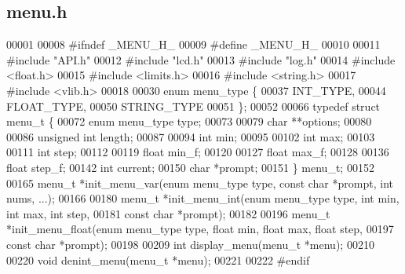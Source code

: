 \subsection{menu.\+h}
\label{menu_8h_source}

\begin{DoxyCode}
00001 
00008 \textcolor{preprocessor}{#ifndef \_MENU\_H\_}
00009 \textcolor{preprocessor}{#define \_MENU\_H\_}
00010 
00011 \textcolor{preprocessor}{#include "API.h"}
00012 \textcolor{preprocessor}{#include "lcd.h"}
00013 \textcolor{preprocessor}{#include "log.h"}
00014 \textcolor{preprocessor}{#include <float.h>}
00015 \textcolor{preprocessor}{#include <limits.h>}
00016 \textcolor{preprocessor}{#include <string.h>}
00017 \textcolor{preprocessor}{#include <vlib.h>}
00018 
00030 \textcolor{keyword}{enum} menu_type \{
00037   INT_TYPE,
00044   FLOAT_TYPE,
00050   STRING_TYPE
00051 \};
00052 
00066 \textcolor{keyword}{typedef} \textcolor{keyword}{struct }menu_t \{
00072   \textcolor{keyword}{enum} menu_type type;
00073 
00079   \textcolor{keywordtype}{char} **options;
00080 
00086   \textcolor{keywordtype}{unsigned} \textcolor{keywordtype}{int} length;
00087 
00094   \textcolor{keywordtype}{int} min;
00095 
00102   \textcolor{keywordtype}{int} max;
00103 
00111   \textcolor{keywordtype}{int} step;
00112 
00119   \textcolor{keywordtype}{float} min_f;
00120 
00127   \textcolor{keywordtype}{float} max_f;
00128 
00136   \textcolor{keywordtype}{float} step_f;
00142   \textcolor{keywordtype}{int} current;
00150   \textcolor{keywordtype}{char} *prompt;
00151 \} menu_t;
00152 
00165 menu_t *init_menu_var(\textcolor{keyword}{enum} menu_type type, \textcolor{keyword}{const} \textcolor{keywordtype}{char} *prompt, \textcolor{keywordtype}{int} nums, ...);
00166 
00180 menu_t *init_menu_int(\textcolor{keyword}{enum} menu_type type, \textcolor{keywordtype}{int} min, \textcolor{keywordtype}{int} max, \textcolor{keywordtype}{int} step,
00181                       \textcolor{keyword}{const} \textcolor{keywordtype}{char} *prompt);
00182 
00196 menu_t *init_menu_float(\textcolor{keyword}{enum} menu_type type, \textcolor{keywordtype}{float} min, \textcolor{keywordtype}{float} max, \textcolor{keywordtype}{float} step,
00197                         \textcolor{keyword}{const} \textcolor{keywordtype}{char} *prompt);
00198 
00209 \textcolor{keywordtype}{int} display_menu(menu_t *menu);
00210 
00220 \textcolor{keywordtype}{void} denint_menu(menu_t *menu);
00221 
00222 \textcolor{preprocessor}{#endif}
\end{DoxyCode}
